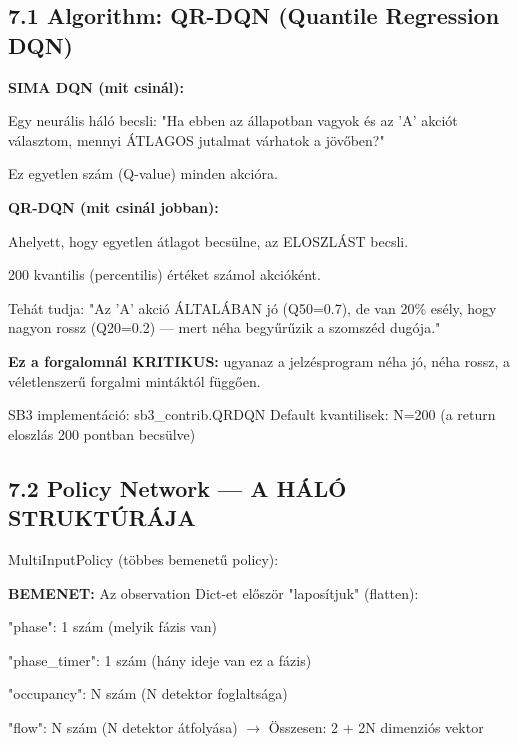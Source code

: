 \documentclass[11pt,a4paper]{article}
\begin{document}
\subsection*{7.1 Algorithm: QR-DQN (Quantile Regression DQN)}
\textbf{SIMA DQN (mit csinál):}
\par\noindent\hspace*{1em}\textbullet{} Egy neurális háló becsli: "Ha ebben az állapotban vagyok és
az 'A' akciót választom, mennyi ÁTLAGOS jutalmat várhatok a jövőben?"
\par\noindent\hspace*{1em}\textbullet{} Ez egyetlen szám (Q-value) minden akcióra.

\textbf{QR-DQN (mit csinál jobban):}
\par\noindent\hspace*{1em}\textbullet{} Ahelyett, hogy egyetlen átlagot becsülne, az ELOSZLÁST becsli.
\par\noindent\hspace*{1em}\textbullet{} 200 kvantilis (percentilis) értéket számol akcióként.
\par\noindent\hspace*{1em}\textbullet{} Tehát tudja: "Az 'A' akció ÁLTALÁBAN jó (Q50=0.7), de van
20\% esély, hogy nagyon rossz (Q20=0.2) — mert néha begyűrűzik
a szomszéd dugója."
\par\noindent\hspace*{1em}\textbullet{} \textbf{Ez a forgalomnál KRITIKUS:} ugyanaz a jelzésprogram néha jó,
néha rossz, a véletlenszerű forgalmi mintáktól függően.

SB3 implementáció: sb3\_contrib.QRDQN
Default kvantilisek: N=200 (a return eloszlás 200 pontban becsülve)

\subsection*{7.2 Policy Network — A HÁLÓ STRUKTÚRÁJA}
MultiInputPolicy (többes bemenetű policy):

\textbf{BEMENET:}
Az observation Dict-et először "laposítjuk" (flatten):
\par\noindent\hspace*{1em}\textbullet{} "phase": 1 szám (melyik fázis van)
\par\noindent\hspace*{1em}\textbullet{} "phase\_timer": 1 szám (hány ideje van ez a fázis)
\par\noindent\hspace*{1em}\textbullet{} "occupancy": N szám (N detektor foglaltsága)
\par\noindent\hspace*{1em}\textbullet{} "flow": N szám (N detektor átfolyása)
$\rightarrow$ Összesen: 2 + 2N dimenziós vektor
\end{document}
